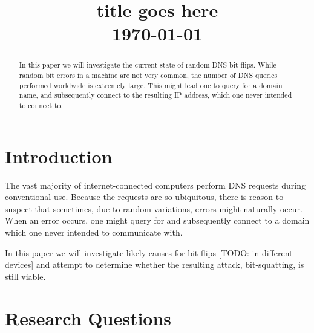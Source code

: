 \documentclass[conference]{IEEEtran}
\begin{document}
\title{title goes here \\\vspace{5mm} \large  \today}
\author{
\and
{}
}
\maketitle
\thispagestyle{plain}
\pagestyle{plain}

\begin{abstract}

	In this paper we will investigate the current state of random DNS bit flips.
	While random bit errors in a machine are not very common, the number of DNS
	queries performed worldwide is extremely large. This might lead one to query
	for a domain name, and subsequently connect to the resulting IP address, which
	one never intended to connect to.

\end{abstract}

\section{Introduction}

The vast majority of internet-connected computers perform DNS requests during
conventional use. Because the requests are so ubiquitous, there is reason to
suspect that sometimes, due to random variations, errors might naturally occur.
When an error occurs, one might query for and subsequently connect to a domain
which one never intended to communicate with.

In this paper we will investigate likely causes for bit flips [TODO: in
different devices] and attempt to determine whether the resulting attack,
bit-squatting, is still viable.



\section{Research Questions}\label{sec:researchq}
\end{document}
